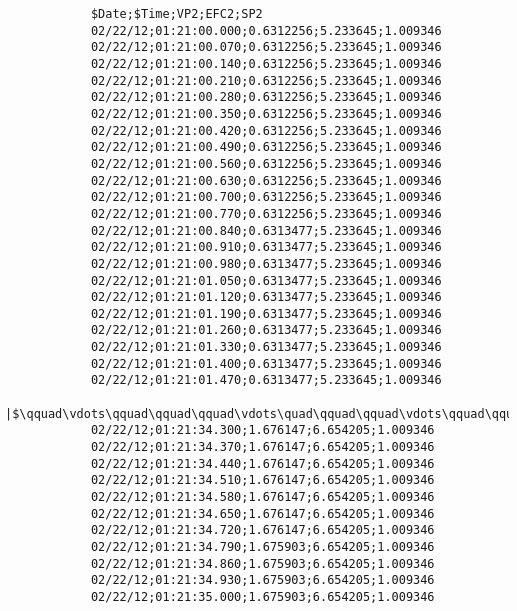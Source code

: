     \begin{longlisting}				
        \begin{verbatim}
            $Date;$Time;VP2;EFC2;SP2
            02/22/12;01:21:00.000;0.6312256;5.233645;1.009346
            02/22/12;01:21:00.070;0.6312256;5.233645;1.009346
            02/22/12;01:21:00.140;0.6312256;5.233645;1.009346
            02/22/12;01:21:00.210;0.6312256;5.233645;1.009346
            02/22/12;01:21:00.280;0.6312256;5.233645;1.009346
            02/22/12;01:21:00.350;0.6312256;5.233645;1.009346
            02/22/12;01:21:00.420;0.6312256;5.233645;1.009346
            02/22/12;01:21:00.490;0.6312256;5.233645;1.009346
            02/22/12;01:21:00.560;0.6312256;5.233645;1.009346
            02/22/12;01:21:00.630;0.6312256;5.233645;1.009346
            02/22/12;01:21:00.700;0.6312256;5.233645;1.009346
            02/22/12;01:21:00.770;0.6312256;5.233645;1.009346
            02/22/12;01:21:00.840;0.6313477;5.233645;1.009346
            02/22/12;01:21:00.910;0.6313477;5.233645;1.009346
            02/22/12;01:21:00.980;0.6313477;5.233645;1.009346
            02/22/12;01:21:01.050;0.6313477;5.233645;1.009346
            02/22/12;01:21:01.120;0.6313477;5.233645;1.009346
            02/22/12;01:21:01.190;0.6313477;5.233645;1.009346
            02/22/12;01:21:01.260;0.6313477;5.233645;1.009346
            02/22/12;01:21:01.330;0.6313477;5.233645;1.009346
            02/22/12;01:21:01.400;0.6313477;5.233645;1.009346
            02/22/12;01:21:01.470;0.6313477;5.233645;1.009346
            |$\qquad\vdots\qquad\qquad\qquad\vdots\quad\qquad\qquad\vdots\qquad\qquad\quad\vdots\qquad\qquad\vdots$|
            02/22/12;01:21:34.300;1.676147;6.654205;1.009346
            02/22/12;01:21:34.370;1.676147;6.654205;1.009346
            02/22/12;01:21:34.440;1.676147;6.654205;1.009346
            02/22/12;01:21:34.510;1.676147;6.654205;1.009346
            02/22/12;01:21:34.580;1.676147;6.654205;1.009346
            02/22/12;01:21:34.650;1.676147;6.654205;1.009346
            02/22/12;01:21:34.720;1.676147;6.654205;1.009346
            02/22/12;01:21:34.790;1.675903;6.654205;1.009346
            02/22/12;01:21:34.860;1.675903;6.654205;1.009346
            02/22/12;01:21:34.930;1.675903;6.654205;1.009346
            02/22/12;01:21:35.000;1.675903;6.654205;1.009346
        \end{verbatim}
    \end{longlisting}

